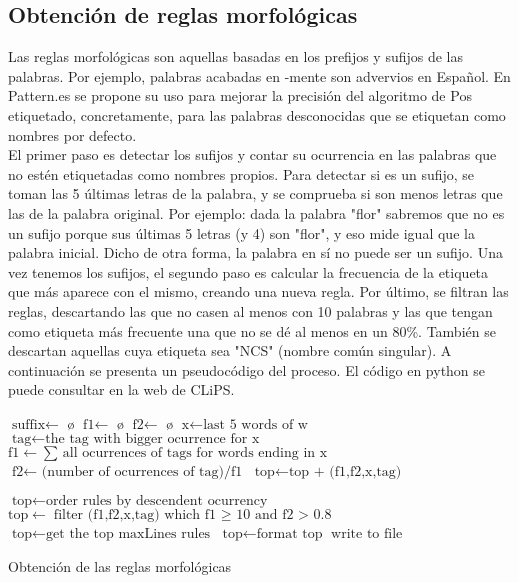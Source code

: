 \subsection*{Obtención de reglas morfológicas}
Las reglas morfológicas son aquellas basadas en los prefijos y sufijos de las palabras. Por ejemplo, 
palabras acabadas en \textsf{-mente} son advervios en Español. En \textcolor{SchoolColor}{Pattern.es} se propone su uso para mejorar la precisión del algoritmo de Pos etiquetado, concretamente, para las palabras desconocidas que se etiquetan como nombres por defecto.\\[\baselineskip]
El primer paso es detectar los sufijos y contar su ocurrencia en las palabras que no estén etiquetadas como nombres propios. Para detectar si es un sufijo, se toman las 5 últimas letras de la palabra, y se comprueba si son menos letras que las de la palabra original. Por ejemplo: dada la palabra "flor" sabremos que no es un sufijo porque sus últimas 5 letras (y 4) son "flor", y eso mide igual que la \newline palabra inicial. Dicho de otra forma, la palabra en sí no puede ser un sufijo.\newline
Una vez tenemos los sufijos, el segundo paso es calcular la frecuencia de la etiqueta que más aparece con el mismo, creando una nueva regla. Por último, se filtran las reglas, descartando las que no casen al menos con 10 palabras y las que tengan como etiqueta más frecuente una que no se dé al menos en un 80\%. También se descartan aquellas cuya etiqueta sea \textsf{"NCS"} (nombre común singular). A continuación se presenta un pseudocódigo del proceso. El código en python se puede consultar en la web de \textcolor{SchoolColor}{CLiPS}.
\begin{algorithm}[H]
    \begin{algorithmic}[1]
    \State $\text{suffix} \gets$ \o
    \State $\text{f1} \gets$ \o
    \State $\text{f2} \gets$ \o 
            \State $\text{x} \gets \text{last 5 words of w}$
             \State {} \EndIf
            \EndFor
    \EndFor        
    		\State $\text{tag} \gets \text{the tag with bigger ocurrence for x}$
            \State $\text{f1} \gets \text{$\sum$ all ocurrences of tags for words ending in x}$
            \State $\text{f2} \gets \text{ (number of ocurrences of tag)/f1}$ 
            \State $\text{top} \gets \text{top + (f1,f2,x,tag) }$
    \EndFor
            
     \State $\text{top} \gets \text{order rules by descendent ocurrency}$
     \State $\text{top} \gets \text{filter (f1,f2,x,tag) which f1 $\geq$ 10 and f2 > 0.8 }$
     \State $\text{top} \gets \text{get the top maxLines rules}$
     \State $\text{top} \gets \text{format top}$
     \State $\text{write to file}$     
        \EndProcedure
    \end{algorithmic}
    \label{alg:rAP}
    \caption{Obtención de las reglas morfológicas}
\end{algorithm}       

